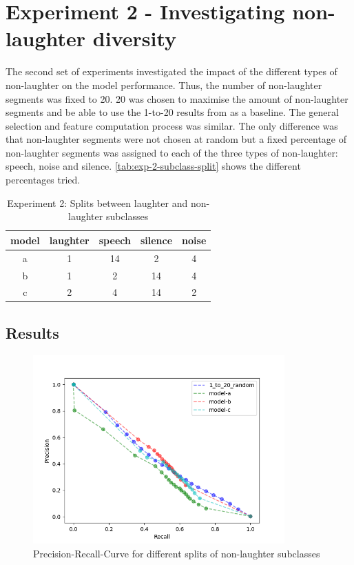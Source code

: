 \documentclass[bsc,frontabs,parskip,deptreport]{infthesis}
\begin{document}
\section{Experiment 2 - Investigating non-laughter diversity}
The second set of experiments investigated the impact of the different types of non-laughter on the model performance. 
Thus, the number of non-laughter segments was fixed to 20. 20 was chosen to maximise the amount of non-laughter segments and be able to use the 1-to-20 results from  as a baseline.
The general selection and feature computation process was similar.
The only difference was that non-laughter segments were not chosen at random but a fixed percentage of non-laughter segments was assigned to each of the three types of non-laughter: speech, noise and silence.
\autoref{tab:exp-2-subclass-split} shows the different percentages tried.

\begin{table}[h!]
    \centering
    \begin{tabular}{|c|c|c|c|c|}
        \hline
        model & laughter & speech & silence & noise \\
        \hline
        a & 1 & 14 & 2 & 4 \\
        b & 1 &  2 & 14 & 4\\
        c & 2 & 4  & 14 & 2\\ 
        \hline
    \end{tabular}
    \caption{Experiment 2: Splits between laughter and non-laughter subclasses}
    \label{tab:exp-2-subclass-split}
\end{table}

\subsection{Results}
\begin{figure}[h!]
    \centering
    \includegraphics[width = 3.8in]{imgs/prec-recall/structured/dev_compare_class_balance_dev_set.png}
    \caption{Precision-Recall-Curve for different splits of non-laughter subclasses}
    \label{fig:prec-recall-struc}
\end{figure}
\end{document}
